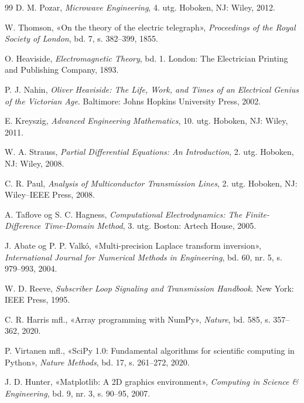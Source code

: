 \documentclass[11pt,a4paper]{article}
\numberwithin{equation}{section}
\numberwithin{figure}{section}
\numberwithin{table}{section}
\begin{document}
\begin{thebibliography}{99}
D. M. Pozar, \emph{Microwave Engineering}, 4. utg. Hoboken, NJ: Wiley, 2012.

W. Thomson, «On the theory of the electric telegraph», \emph{Proceedings of the
Royal Society of London}, bd. 7, s. 382--399, 1855.

O. Heaviside, \emph{Electromagnetic Theory}, bd. 1. London: The Electrician
Printing and Publishing Company, 1893.

P. J. Nahin, \emph{Oliver Heaviside: The Life, Work, and Times of an Electrical
Genius of the Victorian Age}. Baltimore: Johns Hopkins University Press, 2002.

E. Kreyszig, \emph{Advanced Engineering Mathematics}, 10. utg. Hoboken, NJ:
Wiley, 2011.

W. A. Strauss, \emph{Partial Differential Equations: An Introduction}, 2. utg.
Hoboken, NJ: Wiley, 2008.

C. R. Paul, \emph{Analysis of Multiconductor Transmission Lines}, 2. utg.
Hoboken, NJ: Wiley--IEEE Press, 2008.

A. Taflove og S. C. Hagness, \emph{Computational Electrodynamics: The
Finite-Difference Time-Domain Method}, 3. utg. Boston: Artech House, 2005.

J. Abate og P. P. Valkó, «Multi-precision Laplace transform inversion»,
\emph{International Journal for Numerical Methods in Engineering}, bd. 60,
nr. 5, s. 979--993, 2004.

W. D. Reeve, \emph{Subscriber Loop Signaling and Transmission Handbook}.
New York: IEEE Press, 1995.

C. R. Harris mfl., «Array programming with NumPy», \emph{Nature}, bd. 585,
s. 357--362, 2020.

P. Virtanen mfl., «SciPy 1.0: Fundamental algorithms for scientific computing
in Python», \emph{Nature Methods}, bd. 17, s. 261--272, 2020.

J. D. Hunter, «Matplotlib: A 2D graphics environment», \emph{Computing in
Science \& Engineering}, bd. 9, nr. 3, s. 90--95, 2007.
\end{thebibliography}
\end{document}
